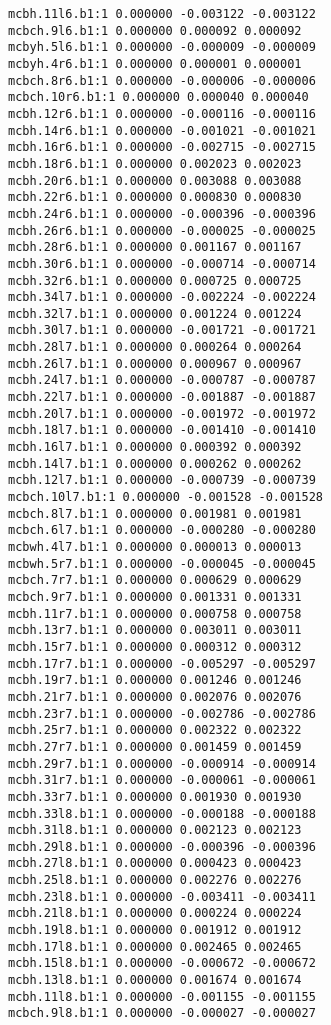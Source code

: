 \begin{verbatim}
mcbh.11l6.b1:1 0.000000 -0.003122 -0.003122
mcbch.9l6.b1:1 0.000000 0.000092 0.000092
mcbyh.5l6.b1:1 0.000000 -0.000009 -0.000009
mcbyh.4r6.b1:1 0.000000 0.000001 0.000001
mcbch.8r6.b1:1 0.000000 -0.000006 -0.000006
mcbch.10r6.b1:1 0.000000 0.000040 0.000040
mcbh.12r6.b1:1 0.000000 -0.000116 -0.000116
mcbh.14r6.b1:1 0.000000 -0.001021 -0.001021
mcbh.16r6.b1:1 0.000000 -0.002715 -0.002715
mcbh.18r6.b1:1 0.000000 0.002023 0.002023
mcbh.20r6.b1:1 0.000000 0.003088 0.003088
mcbh.22r6.b1:1 0.000000 0.000830 0.000830
mcbh.24r6.b1:1 0.000000 -0.000396 -0.000396
mcbh.26r6.b1:1 0.000000 -0.000025 -0.000025
mcbh.28r6.b1:1 0.000000 0.001167 0.001167
mcbh.30r6.b1:1 0.000000 -0.000714 -0.000714
mcbh.32r6.b1:1 0.000000 0.000725 0.000725
mcbh.34l7.b1:1 0.000000 -0.002224 -0.002224
mcbh.32l7.b1:1 0.000000 0.001224 0.001224
mcbh.30l7.b1:1 0.000000 -0.001721 -0.001721
mcbh.28l7.b1:1 0.000000 0.000264 0.000264
mcbh.26l7.b1:1 0.000000 0.000967 0.000967
mcbh.24l7.b1:1 0.000000 -0.000787 -0.000787
mcbh.22l7.b1:1 0.000000 -0.001887 -0.001887
mcbh.20l7.b1:1 0.000000 -0.001972 -0.001972
mcbh.18l7.b1:1 0.000000 -0.001410 -0.001410
mcbh.16l7.b1:1 0.000000 0.000392 0.000392
mcbh.14l7.b1:1 0.000000 0.000262 0.000262
mcbh.12l7.b1:1 0.000000 -0.000739 -0.000739
mcbch.10l7.b1:1 0.000000 -0.001528 -0.001528
mcbch.8l7.b1:1 0.000000 0.001981 0.001981
mcbch.6l7.b1:1 0.000000 -0.000280 -0.000280
mcbwh.4l7.b1:1 0.000000 0.000013 0.000013
mcbwh.5r7.b1:1 0.000000 -0.000045 -0.000045
mcbch.7r7.b1:1 0.000000 0.000629 0.000629
mcbch.9r7.b1:1 0.000000 0.001331 0.001331
mcbh.11r7.b1:1 0.000000 0.000758 0.000758
mcbh.13r7.b1:1 0.000000 0.003011 0.003011
mcbh.15r7.b1:1 0.000000 0.000312 0.000312
mcbh.17r7.b1:1 0.000000 -0.005297 -0.005297
mcbh.19r7.b1:1 0.000000 0.001246 0.001246
mcbh.21r7.b1:1 0.000000 0.002076 0.002076
mcbh.23r7.b1:1 0.000000 -0.002786 -0.002786
mcbh.25r7.b1:1 0.000000 0.002322 0.002322
mcbh.27r7.b1:1 0.000000 0.001459 0.001459
mcbh.29r7.b1:1 0.000000 -0.000914 -0.000914
mcbh.31r7.b1:1 0.000000 -0.000061 -0.000061
mcbh.33r7.b1:1 0.000000 0.001930 0.001930
mcbh.33l8.b1:1 0.000000 -0.000188 -0.000188
mcbh.31l8.b1:1 0.000000 0.002123 0.002123
mcbh.29l8.b1:1 0.000000 -0.000396 -0.000396
mcbh.27l8.b1:1 0.000000 0.000423 0.000423
mcbh.25l8.b1:1 0.000000 0.002276 0.002276
mcbh.23l8.b1:1 0.000000 -0.003411 -0.003411
mcbh.21l8.b1:1 0.000000 0.000224 0.000224
mcbh.19l8.b1:1 0.000000 0.001912 0.001912
mcbh.17l8.b1:1 0.000000 0.002465 0.002465
mcbh.15l8.b1:1 0.000000 -0.000672 -0.000672
mcbh.13l8.b1:1 0.000000 0.001674 0.001674
mcbh.11l8.b1:1 0.000000 -0.001155 -0.001155
mcbch.9l8.b1:1 0.000000 -0.000027 -0.000027

\end{verbatim}
